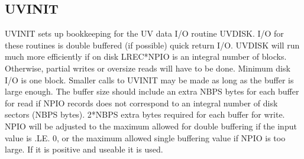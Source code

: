 \subsection{UVINIT}
UVINIT sets up bookkeeping for the UV data I/O routine UVDISK.  I/O
for these routines is double buffered (if possible) quick return
I/O.  UVDISK will run much more efficiently if on disk LREC*NPIO
is an integral number of blocks.  Otherwise, partial writes or
oversize reads will have to be done.  Minimum disk I/O is one
block.  Smaller calls to UVINIT may be made as long as the buffer
is large enough.  The buffer size should include
an extra NBPS bytes for each buffer for  read if NPIO
records does not correspond to an integral number of disk sectors
(NBPS bytes).  2*NBPS extra bytes required for each buffer for
write.
     NPIO will be adjusted to the maximum allowed for double
buffering if the input value is .LE. 0, or the maximum allowed
single buffering value if NPIO is too large.  If it is positive and
useable it is used.
